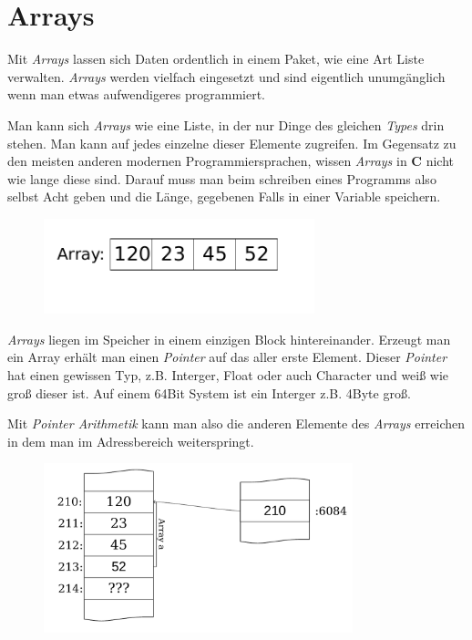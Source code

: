 \documentclass[c_worksheet.tex]{subfiles}
\begin{document}
	
\chapter{Arrays} 

Mit \emph{Arrays} lassen sich Daten ordentlich in einem Paket, wie eine Art Liste verwalten. \emph{Arrays} werden vielfach eingesetzt und sind eigentlich unumgänglich wenn man etwas aufwendigeres programmiert.

Man kann sich \emph{Arrays} wie eine Liste, in der nur Dinge des gleichen \emph{Types} drin stehen. Man kann auf jedes einzelne dieser Elemente zugreifen. Im Gegensatz zu den meisten anderen modernen Programmiersprachen, wissen \emph{Arrays} in \textbf{C} nicht wie lange diese sind. Darauf muss man beim schreiben eines Programms also selbst Acht geben und die Länge, gegebenen Falls in einer Variable speichern.

\begin{figure}[h]
\center
\includegraphics[width=0.7\textwidth]{Grafiken/Arrays/array.pdf} 
\end{figure}

\emph{Arrays} liegen im Speicher in einem einzigen Block hintereinander. Erzeugt man ein Array erhält man einen \emph{Pointer} auf das aller erste Element. Dieser \emph{Pointer} hat einen gewissen Typ, z.B. Interger, Float oder auch Character und weiß wie groß dieser ist. Auf einem 64Bit System ist ein Interger z.B. 4Byte groß.

Mit \emph{Pointer Arithmetik} kann man also die anderen Elemente des \emph{Arrays} erreichen in dem man im Adressbereich weiterspringt.

\begin{figure}[h]
\center	
\includegraphics[width=0.8\textwidth]{Grafiken/Arrays/array_im_speicher.pdf} 
\end{figure}
\end{document}
